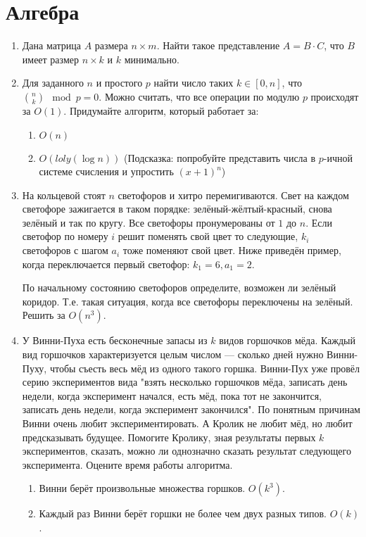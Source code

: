 \section*{Алгебра}
\begin{enumerate}
	\item Дана матрица $A$ размера $n \times m$. Найти такое представление $A = B \cdot C$, что $B$ имеет размер $n 
	\times k$ и $k$ минимально.
	
	\item Для заданного $n$ и простого $p$ найти число таких $k \in [0, n]$, что $\binom{n}{k} \mod p = 0$. Можно 
	считать, что все операции по модулю $p$ происходят за $O(1)$. Придумайте алгоритм, который работает за:
	\begin{enumerate}
		\item $O(n)$
		\item $O(loly(\log n))$ (Подсказка: попробуйте представить числа в $p$-ичной системе счисления и упростить $(x + 1)^n$)
	\end{enumerate}
	
	\item На кольцевой стоят $n$ светофоров и хитро перемигиваются. Свет на каждом светофоре зажигается в таком 
	порядке: зелёный-жёлтый-красный, снова зелёный и так по кругу. Все светофоры пронумерованы от $1$ до $n$. Если 
	светофор по номеру $i$ решит поменять свой цвет то следующие, $k_i$ светофоров с шагом $a_i$ тоже поменяют свой 
	цвет. Ниже приведён пример, когда переключается	первый светофор: $k_1 = 6, a_1 = 2$.
	
	По начальному состоянию светофоров определите, возможен ли зелёный коридор. Т.е. такая ситуация, когда все 
	светофоры переключены на зелёный. Решить за $O(n^3)$.

	\item У Винни-Пуха есть бесконечные запасы из $k$ видов горшочков мёда. Каждый вид горшочков характеризуется 
	целым числом — сколько дней нужно Винни-Пуху, чтобы съесть весь мёд из одного такого горшка. Винни-Пух уже 
	провёл серию экспериментов вида "взять несколько горшочков мёда, записать день недели, когда эксперимент 
	начался, есть мёд, пока тот не закончится, записать день недели, когда эксперимент закончился". По понятным 
	причинам Винни очень любит экспериментировать. А Кролик не любит мёд, но любит предсказывать будущее. Помогите 
	Кролику, зная результаты первых $k$ экспериментов, сказать, можно ли однозначно сказать результат следующего 
	эксперимента. Оцените время работы алгоритма.
	\begin{enumerate}
		\item Винни берёт произвольные множества горшков. $O(k^3)$.
		\item Каждый раз Винни берёт горшки не более чем двух разных типов. $O(k)$.
	\end{enumerate}
	
\end{enumerate}
	
